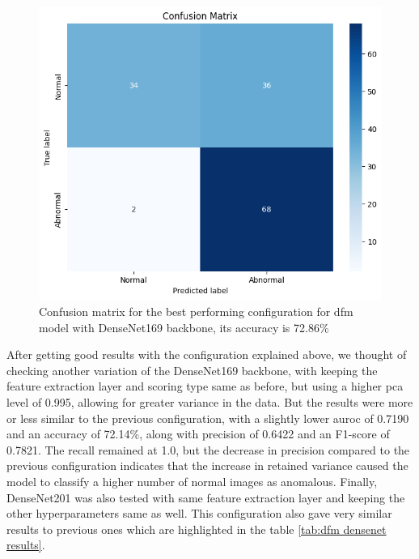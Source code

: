 \begin{figure}[ht!]
    \centering
    \includegraphics[width=1\linewidth]{Rohit_Master_Thesis//Images/dfm_densenet_best_confusion_matrix.png}
    \caption{Confusion matrix for the best performing configuration for \gls{dfm} model with DenseNet169 backbone, its accuracy is 72.86\%}
    \label{fig:dfm densenet169 confusion matrix}
\end{figure}

After getting good results with the configuration explained above, we thought of checking another variation of the DenseNet169 backbone, with keeping the feature extraction layer and scoring type same as before, but using a higher \gls{pca} level of 0.995, allowing for greater variance in the data. But the results were more or less similar to the previous configuration, with a slightly lower \gls{auroc} of 0.7190 and an accuracy of 72.14\%, along with precision of 0.6422 and an F1-score of 0.7821. The recall remained at 1.0, but the decrease in precision compared to the previous configuration indicates that the increase in retained variance caused the model to classify a higher number of normal images as anomalous. Finally, DenseNet201 was also tested with same feature extraction layer and keeping the other hyperparameters same as well. This configuration also gave very similar results to previous ones which are highlighted in the table \ref{tab:dfm densenet results}.



